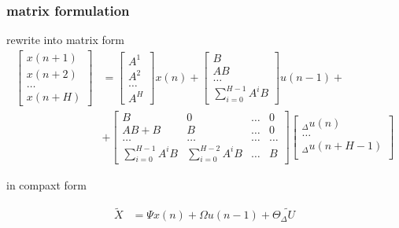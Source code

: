 \documentclass{beamer}
\begin{document}
\begin{frame}
  
  \frametitle{\bf matrix formulation}
  rewrite into matrix form
  \begin{align*}
    \begin{bmatrix}
      x(n+1) \\
      x(n+2) \\
      \dots \\
      x(n+H)
    \end{bmatrix} &= 
    \begin{bmatrix}
      A^1 \\
      A^2 \\
      \dots \\
      A^H
    \end{bmatrix} x(n) +
    \begin{bmatrix}
      B \\
      AB \\
      \dots \\
      \sum_{i=0}^{H-1} A^iB
    \end{bmatrix} u(n-1) + \\
    &+
    \begin{bmatrix}
      B  & 0 & \dots & 0 \\
      AB + B & B & \dots & 0 \\
      \dots & \dots & \dots & \dots \\
      \sum_{i=0}^{H-1}A^iB & \sum_{i=0}^{H-2}A^iB & \dots & B
    \end{bmatrix}
    \begin{bmatrix}
      _\Delta u(n) \\
      \dots \\
      _\Delta u(n + H - 1) \\
    \end{bmatrix} 
  \end{align*}

  in compaxt form

  \begin{align*}
    \tilde{X} &= \Psi x(n) + \Omega u(n-1) + \Theta \tilde{_\Delta U}
  \end{align*}


\end{frame}
\end{document}
